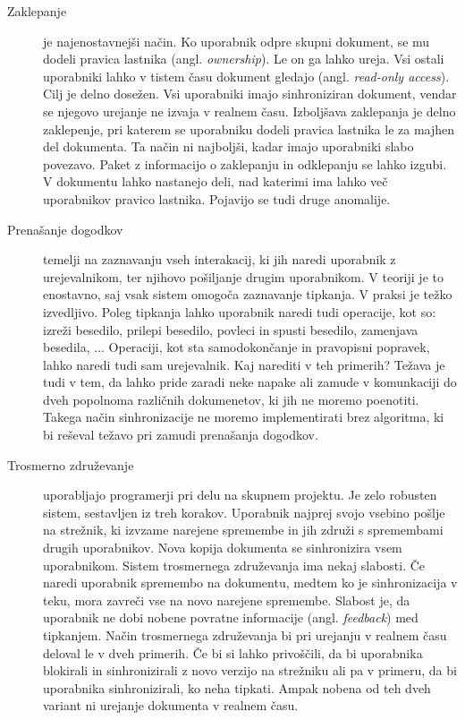 \documentclass[a4paper, 12pt, twoside]{book}
\begin{document}
\begin{description}
      \item[Zaklepanje] je najenostavnejši način. Ko uporabnik odpre skupni dokument, se mu dodeli pravica lastnika (angl. \textit{ownership}). Le on ga lahko ureja. Vsi ostali uporabniki lahko v tistem času dokument gledajo (angl. \textit{read-only access}). Cilj je delno dosežen. Vsi uporabniki imajo sinhroniziran dokument, vendar se njegovo urejanje ne izvaja v realnem času. Izboljšava zaklepanja je delno zaklepenje, pri katerem se uporabniku dodeli pravica lastnika le za majhen del dokumenta. Ta način ni najboljši, kadar imajo uporabniki slabo povezavo. Paket z informacijo o zaklepanju in odklepanju se lahko izgubi. V dokumentu lahko nastanejo deli, nad katerimi ima lahko več uporabnikov pravico lastnika. Pojavijo se tudi druge anomalije.
	\item[Prenašanje dogodkov] temelji na zaznavanju vseh interakacij, ki jih naredi uporabnik z urejevalnikom, ter njihovo pošiljanje drugim uporabnikom. V teoriji je to enostavno, saj vsak sistem omogoča zaznavanje tipkanja. V praksi je težko izvedljivo. Poleg tipkanja lahko uporabnik naredi tudi operacije, kot so: izreži besedilo, prilepi besedilo, povleci in spusti besedilo, zamenjava besedila, ... Operaciji, kot sta samodokončanje in pravopisni popravek, lahko naredi tudi sam urejevalnik. Kaj narediti v teh primerih? Težava je tudi v tem, da lahko pride zaradi neke napake ali zamude v komunkaciji do dveh popolnoma različnih dokumenetov, ki jih ne moremo poenotiti. Takega način sinhronizacije ne moremo implementirati brez algoritma, ki bi reševal težavo pri zamudi prenašanja dogodkov.
	\item[Trosmerno združevanje] uporabljajo programerji pri delu na skupnem projektu. Je zelo robusten sistem, sestavljen iz treh korakov. Uporabnik najprej svojo vsebino pošlje na strežnik, ki izvzame narejene spremembe in jih združi s spremembami drugih uporabnikov. Nova kopija dokumenta se sinhronizira vsem uporabnikom. Sistem trosmernega združevanja ima nekaj slabosti. Če naredi uporabnik spremembo na dokumentu, medtem ko je sinhronizacija v teku, mora zavreči vse na novo narejene spremembe. Slabost je, da uporabnik ne dobi nobene povratne informacije (angl. \textit{feedback}) med tipkanjem. Način trosmernega združevanja bi pri urejanju v realnem času deloval le v dveh primerih. Če bi si lahko privoščili, da bi uporabnika blokirali in sinhronizirali z novo verzijo na strežniku ali pa v primeru, da bi uporabnika sinhronizirali, ko neha tipkati. Ampak nobena od teh dveh variant ni urejanje dokumenta v realnem času.
\end{description}
\end{document}
